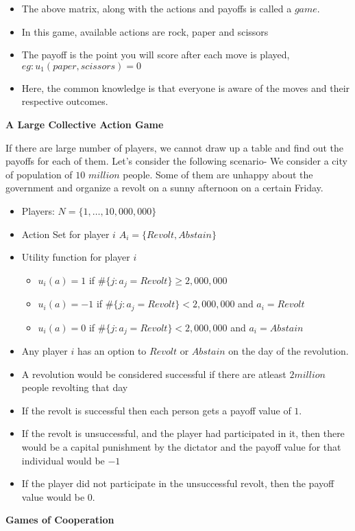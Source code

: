 		\begin{itemize}
		\item The above matrix, along with the actions and payoffs is called a $game$.
		\item In this game, available actions are rock, paper and scissors
		\item The payoff is the point you will score after each move is played, $eg:  u_1 (paper, scissors) = 0$
		\item Here, the common knowledge is that everyone is aware of the moves and their respective outcomes. 
		\end{itemize}
		\textbf{A Large Collective Action Game} \newline
		
		If there are large number of players, we cannot draw up a table and find out the payoffs for each of them. Let's consider the following scenario-\newline
		We consider a city of population of $10$ $million$ people. Some of them are unhappy about the government and organize a revolt on a sunny afternoon on a certain Friday.
		\begin{itemize}
		\item Players: $N = \{1, \dots , 10,000,000\}$	
		\item Action Set for player $i$ $ A_i = \{Revolt, Abstain\}$
		\item Utility function for player $i$
			\begin{itemize}
			\item $u_i(a) = 1$ if \#$\{j: a_j = Revolt\} \geq 2,000,000$
			\item $u_i(a) = -1$ if \#$\{j: a_j = Revolt\} < 2,000,000$ and $a_i = Revolt$
			\item $u_i(a) = 0$ if \#$\{j: a_j = Revolt\} < 2,000,000$ and $a_i = Abstain$
			\end{itemize} 
		
		\item Any player $i$ has an option to $Revolt$ or $Abstain$ on the day of the revolution. 
		\item A revolution would be considered successful if there are atleast $2 $$million$ people revolting that day
		\item If the revolt is successful then each person gets a payoff value of $1$.
		\item If the revolt is unsuccessful, and the player had participated in it, then there would be a capital punishment by the dictator and the payoff value for that individual would be $-1$
		\item If the player did not participate in the unsuccessful revolt, then the payoff value would be $0$.
		
		\end{itemize}
	\textbf{Games of Cooperation}\newline
		
